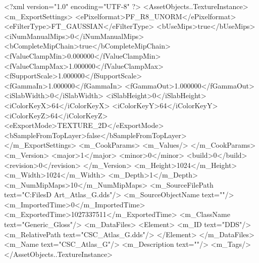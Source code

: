 <?xml version="1.0" encoding="UTF-8" ?>
<AssetObjects..TextureInstance>
	<m_ExportSettings>
		<ePixelformat>PF_R8_UNORM</ePixelformat>
		<eFilterType>FT_GAUSSIAN</eFilterType>
		<bUseMips>true</bUseMips>
		<iNumManualMips>0</iNumManualMips>
		<bCompleteMipChain>true</bCompleteMipChain>
		<fValueClampMin>0.000000</fValueClampMin>
		<fValueClampMax>1.000000</fValueClampMax>
		<fSupportScale>1.000000</fSupportScale>
		<fGammaIn>1.000000</fGammaIn>
		<fGammaOut>1.000000</fGammaOut>
		<iSlabWidth>0</iSlabWidth>
		<iSlabHeight>0</iSlabHeight>
		<iColorKeyX>64</iColorKeyX>
		<iColorKeyY>64</iColorKeyY>
		<iColorKeyZ>64</iColorKeyZ>
		<eExportMode>TEXTURE_2D</eExportMode>
		<bSampleFromTopLayer>false</bSampleFromTopLayer>
	</m_ExportSettings>
	<m_CookParams>
		<m_Values/>
	</m_CookParams>
	<m_Version>
		<major>1</major>
		<minor>0</minor>
		<build>0</build>
		<revision>0</revision>
	</m_Version>
	<m_Height>1024</m_Height>
	<m_Width>1024</m_Width>
	<m_Depth>1</m_Depth>
	<m_NumMipMaps>10</m_NumMipMaps>
	<m_SourceFilePath text="C:\Users\Shadow\Desktop\Working Files\3D Art\Textures\CSC_Atlas_G.dds"/>
	<m_SourceObjectName text=""/>
	<m_ImportedTime>0</m_ImportedTime>
	<m_ExportedTime>1027337511</m_ExportedTime>
	<m_ClassName text="Generic_Gloss"/>
	<m_DataFiles>
		<Element>
			<m_ID text="DDS"/>
			<m_RelativePath text="CSC_Atlas_G.dds"/>
		</Element>
	</m_DataFiles>
	<m_Name text="CSC_Atlas_G"/>
	<m_Description text=""/>
	<m_Tags/>
</AssetObjects..TextureInstance>

